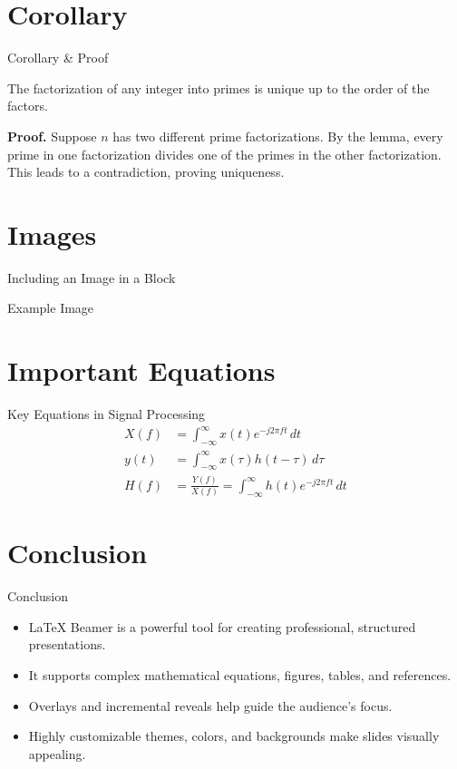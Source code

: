 \documentclass[10pt]{beamer}
\theoremstyle{definition}
\begin{document}
	\section{Corollary}
	\begin{frame}{Corollary \& Proof}
		\begin{corollary}
			The factorization of any integer into primes is unique up to the order of the factors.
		\end{corollary}
		\textbf{Proof.}
		Suppose $n$ has two different prime factorizations. By the lemma, every prime in one factorization divides one of the primes in the other factorization. This leads to a contradiction, proving uniqueness.
	\end{frame}
	
	\section{Images}
	\begin{frame}{Including an Image in a Block}
		\begin{block}{Example Image}
			\centering
		\end{block}
	\end{frame}
	
	\section{Important Equations}
	\begin{frame}{Key Equations in Signal Processing}
		\begin{align*}
			X(f) &= \int_{-\infty}^{\infty} x(t) e^{-j2\pi f t}\,dt \\
			y(t) &= \int_{-\infty}^{\infty} x(\tau) h(t-\tau) \, d\tau \\
			H(f) &= \frac{Y(f)}{X(f)} = \int_{-\infty}^{\infty} h(t) e^{-j2\pi f t} \, dt
		\end{align*}
	\end{frame}
	
	\section{Conclusion}
	\begin{frame}{Conclusion}
		\begin{itemize}[<+->]
			\item \LaTeX{} Beamer is a powerful tool for creating professional, structured presentations.
			\item It supports complex mathematical equations, figures, tables, and references.
			\item Overlays and incremental reveals help guide the audience’s focus.
			\item Highly customizable themes, colors, and backgrounds make slides visually appealing.
		\end{itemize}
	\end{frame}
	
\end{document}
